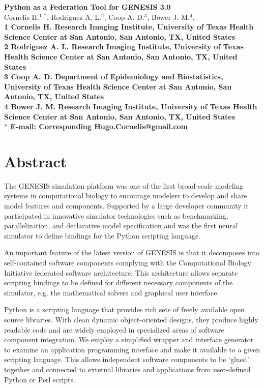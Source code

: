 \documentclass[10pt]{article}
\date{}
\begin{document}
\begin{flushleft}
{\Large
\textbf{Python as a Federation Tool for GENESIS 3.0}
}
\\
Cornelis H.$^{1,\ast}$, 
Rodriguez A. L.$^{2}$, 
Coop A. D.$^{3}$,
Bower J. M.$^{4}$.
\\
\bf{1} Cornelis H. Research Imaging Institute, University of Texas Health Science Center at San Antonio, San Antonio, TX, United States
\\
\bf{2} Rodriguez A. L. Research Imaging Institute, University of Texas Health Science Center at San Antonio, San Antonio, TX, United States
\\
\bf{3} Coop A. D. Department of Epidemiology and Biostatistics, University of Texas Health Science Center at San Antonio, San Antonio, TX, United States
\\
\bf{4} Bower J. M. Research Imaging Institute, University of Texas Health Science Center at San Antonio, San Antonio, TX, United States
\\
$\ast$ E-mail: Corresponding Hugo.Cornelis@gmail.com
\end{flushleft}

\section*{Abstract}

The GENESIS simulation platform was one of the first
broad-scale modeling systems in computational biology to encourage
modelers to develop and share model features and components.
Supported by a large developer community it
participated in innovative simulator technologies such as
benchmarking, parallelization, and declarative model specification and was the first neural simulator to define bindings for the Python scripting language.

An important feature of the latest version of GENESIS is
that it decomposes into self-contained software components
complying with the Computational Biology Initiative federated software
architecture.  This architecture allows separate scripting bindings to be
defined for different necessary components of the simulator, e.g. the mathematical solvers and graphical user interface.

Python is a scripting language that provides rich sets of
freely available open source libraries. With clean dynamic object-oriented
designs, they produce highly readable
code and are widely employed in specialized areas of
software component integration. We employ a simplified wrapper and interface generator to examine an application
programming interface and make it available to a given scripting
language.  This allows independent software components
to be `glued' together and connected to
external libraries and applications from user-defined Python or Perl scripts.
\end{document}
